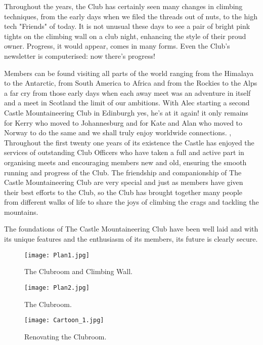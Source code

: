 \documentclass[a5paper,openany,font 10pt]{scrbook}
\begin{document}
Throughout the years, the Club has certainly seen many
changes in climbing techniques, from the early days when we filed
the threads out of nuts, to the high tech "Friends" of today. It
is not unusual these days to see a pair of bright pink tights on
the climbing wall on a club night, enhancing the style of their
proud owner. Progress, it would appear, comes in many forms. Even
the Club's newsletter is computerised: now there's progress!

Members can be found visiting all parts of the world ranging
from the Himalaya to the Antarctic, from South America to Africa
and from the Rockies to the Alps   a far cry from those early
days when each away meet was an adventure in itself and a meet in
Scotland the limit of our ambitions. With Alec starting a second
Castle Mountaineering Club in Edinburgh   yes, he's at it again!
  it only remains for Kerry  who moved to Johannesburg  and for
Kate and Alan  who moved to Norway  to do the same and we shall
truly enjoy worldwide connections. ,
Throughout the first twenty one years of its existence the
Castle has enjoyed the services of outstanding Club Officers who
have taken a full and active part in organising meets and
encouraging members new and old, ensuring the smooth running and
progress of the Club. The friendship and companionship of The
Castle Mountaineering Club are very special and just as members
have given their best efforts to the Club, so the Club has
brought together many people from different walks of life to
share the joys of climbing the crags and tackling the mountains.

The foundations of The Castle Mountaineering Club have been
well laid and with its unique features and the enthusiasm of its
members, its future is clearly secure.

\begin{figure}[htb]
\centering
\texttt{[image: Plan1.jpg]}
\caption{\label{fig:orgparagraph1}
The Clubroom and Climbing Wall.}
\end{figure}

\begin{figure}[htb]
\centering
\texttt{[image: Plan2.jpg]}
\caption{\label{fig:orgparagraph2}
The Clubroom.}
\end{figure}

\begin{figure}[htb]
\centering
\texttt{[image: Cartoon\_1.jpg]}
\caption{\label{fig:orgparagraph3}
Renovating the Clubroom.}
\end{figure}
\end{document}
